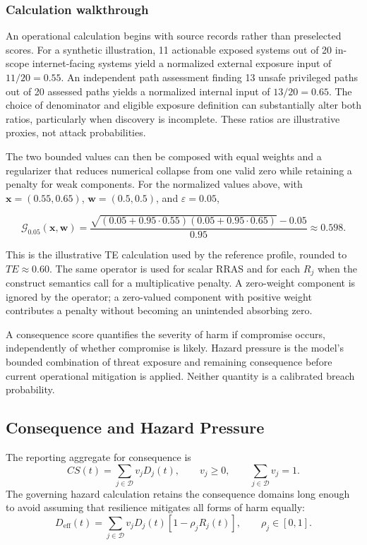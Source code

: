 \documentclass[11pt]{article}
\begin{document}
\subsubsection{Calculation walkthrough}
An operational calculation begins with source records rather than
preselected scores. For a synthetic illustration, 11 actionable exposed
systems out of 20 in-scope internet-facing systems yield a normalized
external exposure input of $11/20=0.55$. An independent path assessment
finding 13 unsafe privileged paths out of 20 assessed paths yields a
normalized internal input of $13/20=0.65$. The choice of denominator and
eligible exposure definition can substantially alter both ratios,
particularly when discovery is incomplete. These ratios are illustrative
proxies, not attack probabilities.

The two bounded values can then be composed with equal weights and a
regularizer that reduces numerical collapse from one valid zero while
retaining a penalty for weak components. For the normalized values above,
with $\mathbf{x}=(0.55,0.65)$, $\mathbf{w}=(0.5,0.5)$, and $\varepsilon=0.05$,

\begin{equation}
  \mathcal{G}_{0.05}(\mathbf{x},\mathbf{w})
  =\frac{\sqrt{(0.05+0.95\cdot0.55)(0.05+0.95\cdot0.65)}-0.05}{0.95}
  \approx0.598.
\end{equation}

This is the illustrative TE calculation used by the reference profile, rounded to
$TE\approx0.60$. The same operator is used for scalar RRAS and for each $R_j$ when the
construct semantics call for a multiplicative penalty. A zero-weight component is
ignored by the operator; a zero-valued component with positive weight contributes a
penalty without becoming an unintended absorbing zero.


A consequence score quantifies the severity of harm if compromise occurs,
independently of whether compromise is likely. Hazard pressure is the
model's bounded combination of threat exposure and remaining consequence
before current operational mitigation is applied. Neither quantity is a
calibrated breach probability.
\subsection{Consequence and Hazard Pressure}
The reporting aggregate for consequence is
\begin{equation}
  CS(t)=\sum_{j\in\mathcal{D}}v_jD_j(t),
  \qquad v_j\geq0,\qquad \sum_{j\in\mathcal{D}}v_j=1.
  \label{eq:cs-aggregate}
\end{equation}
The governing hazard calculation retains the consequence domains long enough to avoid
assuming that resilience mitigates all forms of harm equally:
\begin{equation}
  D_{\mathrm{eff}}(t)=
  \sum_{j\in\mathcal{D}}
  v_jD_j(t)\left[1-\rho_jR_j(t)\right],
  \qquad \rho_j\in[0,1].
  \label{eq:effective-consequence}
\end{equation}
\end{document}

